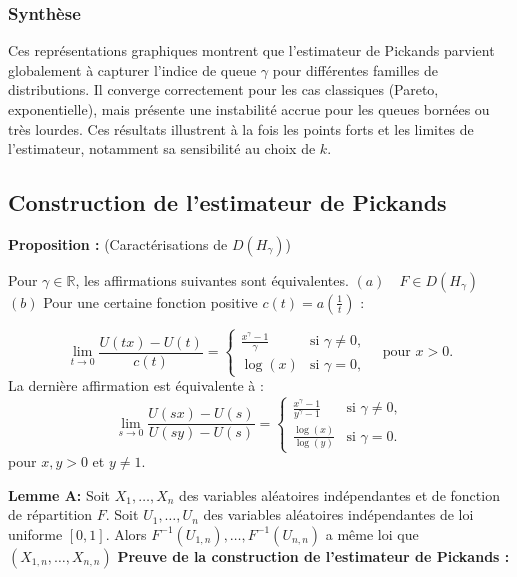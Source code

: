 \documentclass{article}
\begin{document}
\subsubsection{Synthèse}
Ces représentations graphiques montrent que l’estimateur de Pickands parvient globalement à capturer l’indice de queue \(\gamma\) pour différentes familles de distributions. Il converge correctement pour les cas classiques (Pareto, exponentielle), mais présente une instabilité accrue pour les queues bornées ou très lourdes. Ces résultats illustrent à la fois les points forts et les limites de l’estimateur, notamment sa sensibilité au choix de \(k\).

\subsection{Construction de l'estimateur de Pickands}
\textbf{Proposition :} (Caractérisations de \( D(H_{\gamma}) \))

Pour \( \gamma \in \mathbb{R} \), les affirmations suivantes sont équivalentes. \newline
\( (a) \quad F \in D(H_{\gamma}) \) \newline
\( (b) \) Pour une certaine fonction positive \( c(t) = a\left( \frac{1}{t} \right) \) :

\[
\lim_{t \to 0} \frac{U(tx) - U(t)}{c(t)} = 
\begin{cases} 
\frac{x^\gamma - 1}{\gamma} & \text{si } \gamma \neq 0, \\
\log(x) & \text{si } \gamma = 0, 
\end{cases}
\quad \text{pour } x > 0.
\]
La dernière affirmation est équivalente à :
\[
\lim_{s \to 0} \frac{U(sx) - U(s)}{U(sy) - U(s)} = 
\begin{cases} 
\frac{x^\gamma - 1}{y^\gamma - 1} & \text{si } \gamma \neq 0, \\
\frac{\log(x)}{\log(y)} & \text{si } \gamma = 0.
\end{cases}
\]
pour \(x,y > 0\) et \(y \neq 1\). \newline

\textbf{Lemme A:}
Soit \(X_1, \dots, X_n\) des variables aléatoires indépendantes et de fonction de répartition \(F\).
Soit \(U_1, \dots, U_n\) des variables aléatoires indépendantes de loi uniforme \(\left[0,1\right]\). Alors \(F^{-1}(U_{1,n}), \dots, F^{-1}(U_{n,n})\) a même loi que \((X_{1,n}, \dots, X_{n,n})\)\newline
\textbf{Preuve de la construction de l'estimateur de Pickands :}
\end{document}
